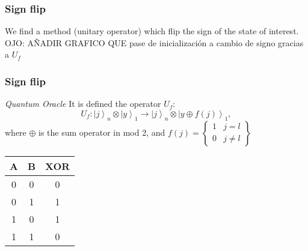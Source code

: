 \begin{frame}
	\frametitle{Sign flip}
	We find a method (unitary operator) which flip the sign of the state of interest.
	OJO: AÑADIR GRAFICO QUE pase de inicialización a cambio de signo gracias a $U_f$ 
\end{frame}
\begin{frame}
	\frametitle{Sign flip}
	\begin{block}{\textit{Quantum Oracle}}
		It is defined the operator $U_f$: 
		\[U_{f}:\left.|j\right\rangle _{n}\otimes\left.|y\right\rangle _{1}\rightarrow\left.|j\right\rangle _{n}\otimes\left.|y\oplus f\left(j\right)\right\rangle _{1},\]
		where $\oplus$ is the sum operator in mod 2, and $f\left(j\right)=\left\{ \begin{array}{cc}
		1  & j=l\\
		0  & j\neq l
		\end{array}\right\} $
	\end{block}
	
	
	\begin{center}
		\begin{tabular}{|c c |c|} 
			\hline
			A & B & XOR \\ 
			\hline\hline
			0&0&0  \\ 
			\hline
			0&1&1  \\ 
			\hline
			1&0&1  \\
			\hline
			1&1&0 \\
			\hline
		\end{tabular}
	\end{center}
\end{frame}

